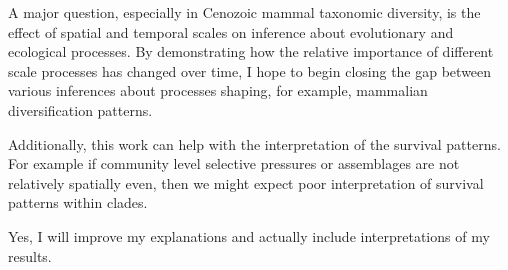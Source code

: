 \documentclass{article}
\begin{document}
A major question, especially in Cenozoic mammal taxonomic diversity, is the effect of spatial and temporal scales on inference about evolutionary and ecological processes. By demonstrating how the relative importance of different scale processes has changed over time, I hope to begin closing the gap between various inferences about processes shaping, for example, mammalian diversification patterns. 

Additionally, this work can help with the interpretation of the survival patterns. For example if community level selective pressures or assemblages are not relatively spatially even, then we might expect poor interpretation of survival patterns within clades.

Yes, I will improve my explanations and actually include interpretations of my results.
\end{document}
